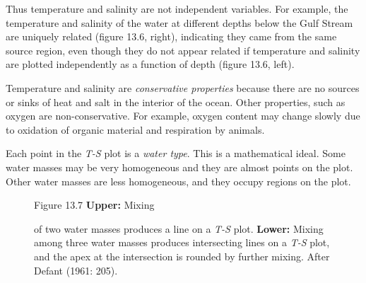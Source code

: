 Thus temperature and salinity are not independent variables. For
example, the temperature and salinity of the water at different depths
below the Gulf Stream are uniquely
related (figure 13.6, right), indicating they came from the same
source region, even though they do not appear related if temperature
and salinity are plotted independently as a function of depth (figure
13.6, left).

Temperature and
salinity are \textit{conservative
  properties} because there are
no sources or sinks of heat and salt in the interior of the
ocean. Other properties, such as oxygen are non-conservative. For
example, oxygen content may change slowly due to oxidation of organic
material and respiration by animals.

Each point in the \textit{T-S} plot is a \textit{water
  type}. This is a
mathematical ideal. Some water masses may be very homogeneous and they
are almost points on the plot. Other water masses are less
homogeneous, and they occupy regions on the plot.

\begin{figure}[t!]
\footnotesize
Figure 13.7 \textbf{Upper:} Mixing \rule{0mm}{3ex}of two water masses
produces a line on a \textit{T-S} plot. \textbf{Lower:} Mixing among
three water masses produces intersecting lines on a \textit{T-S} plot,
and the apex at the intersection is rounded by further
mixing. After Defant (1961: 205).
\label{fig:TSsketch}
\vspace{-3ex}
\end{figure}


